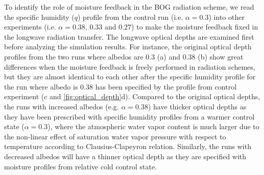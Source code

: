 To identify the role of moisture feedback in the BOG radiation scheme, we read the specific humidity ($q$) profile from the control run (i.e. $\alpha=0.3$) into other experiments (i.e. $\alpha=0.38$, $0.33$ and $0.27$) to make the moisture feedback fixed in the longwave radiation transfer. The longwave optical depths are examined first before analyzing the simulation results. For instance, the original optical depth profiles from the two runs where albedos are 0.3 (a) and 0.38 (b) show great differences when the moisture feedback is freely performed in radiation schemes, but they are almost identical to each other after the specific humidity profile for the run where albedo is 0.38 has been specified by the profile from control experiment (c and \ref{fig:optical_depth}d). Compared to the original optical depths, the runs with increased albedos (e.g. $\alpha=0.38$) have thicker optical depths as they have been prescribed with specific humidity profiles from a warmer control state ($\alpha=0.3$), where the atmospheric water vapor content is much larger due to the non-linear effect of saturation water vapor pressure with respect to temperature according to Clausius-Clapeyron relation. Similarly, the runs with decreased albedos will have a thinner optical depth as they are specified with moisture profiles from relative cold control state.


